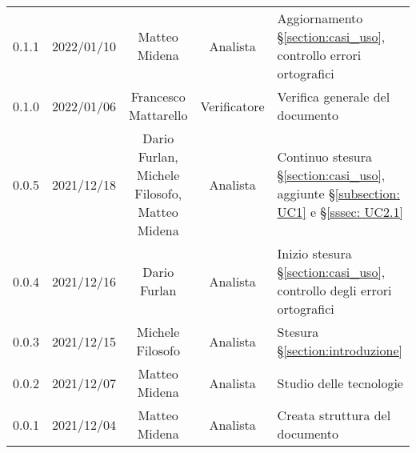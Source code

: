 \begin{center}
\begin{longtable}[c]{c | c | c | c | p{5cm}}
		0.1.1 & 2022/01/10 & Matteo Midena & Analista & Aggiornamento §\ref{section:casi_uso}, controllo errori ortografici\\
		0.1.0 & 2022/01/06 & Francesco Mattarello & Verificatore & Verifica generale del documento\\
		0.0.5 & 2021/12/18 & \Shortunderstack{Dario Furlan,\\Michele Filosofo,\\Matteo Midena\\} & Analista & Continuo stesura §\ref{section:casi_uso}, aggiunte §\ref{subsection: UC1} e §\ref{sssec: UC2.1}\\
		0.0.4 & 2021/12/16 & Dario Furlan & Analista & Inizio stesura §\ref{section:casi_uso}, controllo degli errori ortografici\\
		0.0.3 & 2021/12/15 & Michele Filosofo & Analista & Stesura §\ref{section:introduzione}\\
		0.0.2 & 2021/12/07 & Matteo Midena & Analista & Studio delle tecnologie\\
		0.0.1 & 2021/12/04 & Matteo Midena & Analista & Creata struttura del documento\\
	\end{longtable}
\end{center}
